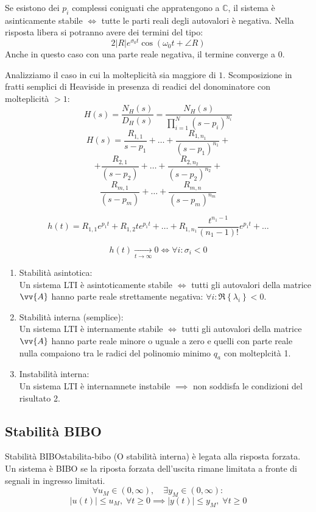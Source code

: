 \documentclass[12pt]{article}
\begin{document}
Se esistono dei $p_i$ complessi coniguati che appratengono a $\mathbb{C}$, il sistema \`e asinticamente stabile $\iff$ tutte le parti reali degli autovalori \`e negativa. Nella risposta libera si potranno avere dei termini del tipo:
\[ 2|R|e^{\sigma_0t}\cos(\omega_0t+\angle R) \]
Anche in questo caso con una parte reale negativa, il termine converge a $0$.

Analizziamo il caso in cui la molteplicit\`a sia maggiore di $1$.
Scomposizione in fratti semplici di Heaviside in presenza di readici del donominatore con molteplicit\`a $> 1$:
\[ H(s) =  \frac{N_H(s)}{D_H(s)} = \frac{N_H(s)}{\prod_{i=1}^{N} (s-p_i)^{n_i} }  \]
\[ H(s) = \frac{R _{1,1}}{s-p_1} + \dots + \frac{R _{1,n_1}}{(s-p_1)^{n_1}} + \]
\[ + \frac{R _{2,1}}{(s-p_2)} + \dots + \frac{R _{2,n_2}}{(s-p_2)^{n_2}} + \]
\[ \frac{R _{m,1}}{(s-p_m)} + \dots + \frac{R _{m,n}}{(s-p_m)^{n_m}} \]

\[ h(t) = R_{1,1}e^{p_1t} + R_{1,2}te^{p_1t} + \dots + R _{1,n_1}\frac{t^{n_1-1}}{(n_1-1)!}e^{p_1t} + \dots \]

\[ \boxed{ h(t) \underset{t \to \infty}{\longrightarrow} 0 \iff \forall i : \sigma_i < 0 } \]

\begin{enumerate}
    \item Stabilit\`a asintotica: \\
        Un sistema LTI \`e asintoticamente stabile $\iff$ tutti gli autovalori della matrice $\vv{A}$ hanno parte reale strettamente negativa: $\forall i: \Re\left\{ \lambda_i \right\} < 0$.
    \item Stabilit\`a interna (semplice): \\
        Un sistema LTI \`e internamente stabile $\iff$ tutti gli autovalori della matrice $\vv{A}$ hanno parte reale minore o uguale a zero e quelli con parte reale nulla compaiono tra le radici del polinomio minimo $q_a$ con molteplcit\`a 1.
    \item Instabilit\`a interna: \\
        Un sistema LTI \`e internamnete instabile $ \implies $ non soddisfa le condizioni del risultato 2.
\end{enumerate}

\newpage
\subsection{Stabilit\`a BIBO}
\begin{definition}{Stabilit\`a BIBO}{stabilita-bibo}
    (O stabilit\`a interna) \`e legata alla risposta forzata. Un sistema \`e BIBO se la riposta forzata dell'uscita rimane limitata a fronte di segnali in ingresso limitati.
    \[ \forall u_M \in (0, \infty),\quad \exists y_M \in (0, \infty): \]
    \[ |u(t)| \leqslant u_M,\;\forall t \geqslant 0 \implies |y(t)| \leqslant y_M,\;\forall t \geqslant 0 \]
\end{definition}
\end{document}
